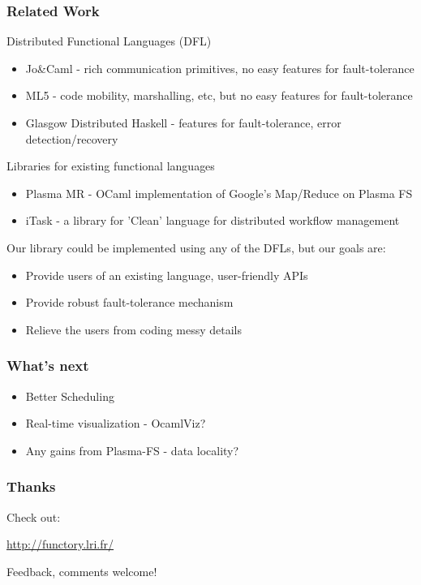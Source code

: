 \documentclass[xcolor=dvipsnames]{beamer}
\begin{document}
\begin{frame}\frametitle {Related Work}
  Distributed Functional Languages (DFL)
  \begin{itemize}
  \item Jo\&Caml - rich communication primitives, no easy features
    for fault-tolerance
  \item ML5 - code mobility, marshalling, etc, but no
    easy features for fault-tolerance
  \item Glasgow Distributed Haskell - features for fault-tolerance,
    error detection/recovery
  \end{itemize}
  Libraries for existing functional languages
  \begin{itemize}
  \item Plasma MR - OCaml implementation of Google's Map/Reduce on
    Plasma FS
  \item iTask - a library for 'Clean' language for distributed workflow management
  \end{itemize}

Our library could be implemented using any of the DFLs, but our goals
are:
\begin{itemize}
\item Provide users of an existing language, user-friendly APIs
\item Provide robust fault-tolerance mechanism 
\item Relieve the users from coding messy details
\end{itemize}
  
\end{frame}


\begin{frame}\frametitle {What's next}
  \begin{itemize}
  \item Better Scheduling
  \item Real-time visualization - OcamlViz?
  \item Any gains from Plasma-FS - data locality?
  \end{itemize}
\end{frame}


\begin{frame}\frametitle {Thanks}


Check out:
\begin{center}
 \textcolor{blue}{\url{http://functory.lri.fr/}}  
\end{center}

Feedback, comments welcome!

\end{frame}

\end{document}
